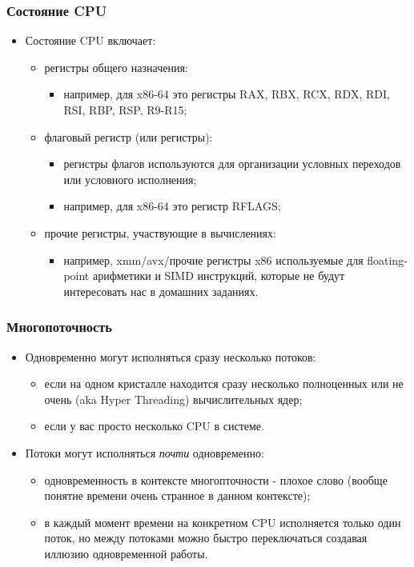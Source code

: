 \begin{frame}
\frametitle{Состояние CPU}
\begin{itemize}
  \item Состояние CPU включает:
  \begin{itemize}
    \item регистры общего назначения:
    \begin{itemize}
      \item например, для x86-64 это регистры RAX, RBX, RCX, RDX, RDI, RSI,
      RBP, RSP, R9-R15;
    \end{itemize}
    \item флаговый регистр (или регистры):
    \begin{itemize}
      \item регистры флагов используются для организации условных переходов или
      условного исполнения;
      \item например, для x86-64 это регистр RFLAGS;
    \end{itemize}
    \item прочие регистры, участвующие в вычислениях:
    \begin{itemize}
      \item например, xmm/avx/прочие регистры x86 используемые для
      floating-point арифметики и SIMD инструкций, которые не будут
      интересовать нас в домашних заданиях.
    \end{itemize}
  \end{itemize}
\end{itemize}
\end{frame}

\begin{frame}
\frametitle{Многопоточность}
\begin{itemize}
  \item Одновременно могут исполняться сразу несколько потоков:
  \begin{itemize}
    \item если на одном кристалле находится сразу несколько полноценных или не
    очень (aka Hyper Threading) вычислительных ядер;
    \item если у вас просто несколько CPU в системе.
  \end{itemize}
  \item Потоки могут исполняться \emph{почти} одновременно:
  \begin{itemize}
    \item одновременность в контексте многопточности - плохое слово (вообще
    понятие времени очень странное в данном контексте);
    \item в каждый момент времени на конкретном CPU исполняется только один
    поток, но между потоками можно быстро переключаться создавая иллюзию
    одновременной работы.
  \end{itemize}
\end{itemize}
\end{frame}

